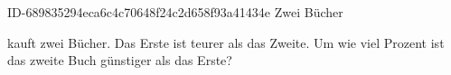 \begin{exercise}
      {ID-689835294eca6c4c70648f24c2d658f93a41434e}
      {Zwei Bücher}
  \ifproblem\problem\par
    \xya{} kauft zwei Bücher. Das Erste ist  teurer als das Zweite.
    Um wie viel Prozent ist das zweite Buch günstiger als das Erste?
  \fi
\end{exercise}
